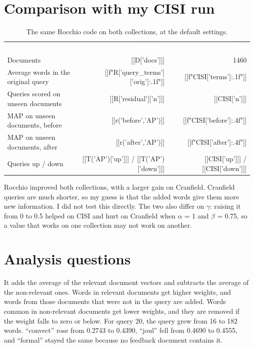 \section{Comparison with my CISI run}
\begin{table}[H]\small\centering\caption{The same Rocchio code on both collections, at the default settings.}
\begin{tabular}{lrr}\rowcolor{navy} & \textcolor{white}{\textbf{Cranfield}} & \textcolor{white}{\textbf{CISI}} \\
Documents & [[D['docs']]] & 1460 \\
Average words in the original query & [[f"{R['query_terms']['orig']:.1f}"]] & [[f"{CISI['terms']:.1f}"]] \\
Queries scored on unseen documents & [[R['residual']['n']]] & [[CISI['n']]] \\
MAP on unseen documents, before & [[r('before','AP')]] & [[f"{CISI['before']:.4f}"]] \\
MAP on unseen documents, after & [[r('after','AP')]] & [[f"{CISI['after']:.4f}"]] \\
Queries up / down & [[T('AP')['up']]] / [[T('AP')['down']]] & [[CISI['up']]] / [[CISI['down']]] \\
\hline\end{tabular}\end{table}
Rocchio improved both collections, with a larger gain on Cranfield. Cranfield queries are much shorter, so my guess is that the added words give them more new information. I did not test this directly. The two also differ on $\gamma$: raising it from 0 to 0.5 helped on CISI and hurt on Cranfield when $\alpha$ = 1 and $\beta$ = 0.75, so a value that works on one collection may not work on another.

\section{Analysis questions}
It adds the average of the relevant document vectors and subtracts the average of the non-relevant ones. Words in relevant documents get higher weights, and words from those documents that were not in the query are added. Words common in non-relevant documents get lower weights, and they are removed if the weight falls to zero or below. For query 20, the query grew from 16 to 182 words. ``convect'' rose from 0.2743 to 0.4390, ``joul'' fell from 0.4690 to 0.4555, and ``formal'' stayed the same because no feedback document contains it.

